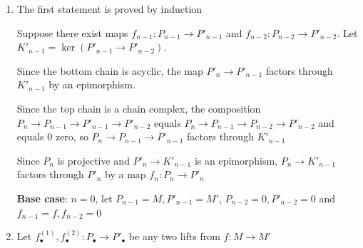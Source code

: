 \documentclass{article}
\begin{document}
\begin{longproof}
    \begin{enumerate}
        \item The first statement is proved by induction
        \begin{center}
        \end{center}

        Suppose there exist maps $f_{n-1}: P_{n-1} \to P'_{n-1}$ and $f_{n-2}: P_{n-2} \to P'_{n-2}$. Let $K'_{n-1} = \ker(P'_{n-1} \to P'_{n-2})$.
        
        Since the bottom chain is acyclic, the map $P'_n \to P'_{n-1}$ factors through $K'_{n-1}$ by an epimorphism.

        Since the top chain is a chain complex, the composition $P_n \to P_{n-1} \to P'_{n-1} \to P'_{n-2}$ equals $P_n \to P_{n-1} \to P_{n-2} \to P'_{n-2}$ and equals 0 zero, so $P_n \to P_{n-1} \to P'_{n-1}$ factors through $K'_{n-1}$

        Since $P_n$ is projective and $P'_n \to K'_{n-1}$ is an epimorphism, $P_n \to K'_{n-1}$ factors through $P'_n$ by a map $f_n: P_n \to P'_n$

        \textbf{Base case}: $n=0$, let $P_{n-1} = M, P'_{n-1} = M'$, $P_{n-2} = 0, P'_{n-2} = 0$ and $f_{n-1} = f, f_{n-2} = 0$
        
        \item Let $f^{(1)}_\bullet, f^{(2)}_\bullet: P_\bullet \to P'_\bullet$ be any two lifts from $f: M \to M'$

        \begin{center}
        \end{center}


\end{enumerate}
\end{longproof}
\end{document}
